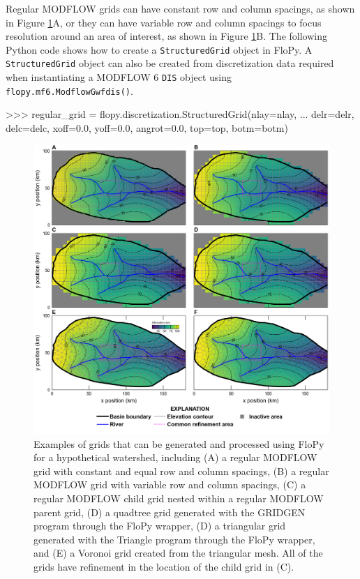 \documentclass[12pt, oneside]{article}  	%
\begin{document}
Regular MODFLOW grids can have constant row and column spacings, as shown in Figure \ref{fig:grids}A, or they can have variable row and column spacings to focus resolution around an area of interest, as shown in Figure \ref{fig:grids}B. The following Python code shows how to create a \texttt{StructuredGrid} object in FloPy. A \texttt{StructuredGrid} object can also be created from discretization data required when instantiating a MODFLOW 6 \texttt{DIS} object using \texttt{flopy.mf6.ModflowGwfdis()}. 

\begin{python}
>>> regular_grid = flopy.discretization.StructuredGrid(nlay=nlay, 
... delr=delr, delc=delc, xoff=0.0, yoff=0.0, angrot=0.0, top=top, botm=botm)
\end{python}


\begin{figure}[ht!]
	\begin{center}
		\includegraphics{figures/grids_geoprocessing.png}
	\end{center}
	\caption{Examples of grids that can be generated and processed using FloPy for a hypothetical watershed, including (A) a regular MODFLOW grid with constant and equal row and column spacings, (B) a regular MODFLOW grid with variable row and column spacings, (C) a regular MODFLOW child grid nested within a regular MODFLOW parent grid, (D) a quadtree grid generated with the GRIDGEN program \citep{gridgen} through the FloPy wrapper, (D) a triangular grid generated with the Triangle program \citep{trianglemesh} through the FloPy wrapper, and (E) a Voronoi grid created from the triangular mesh. All of the grids have refinement in the location of the child grid in (C).}
	\label{fig:grids}
\end{figure}
\end{document}
